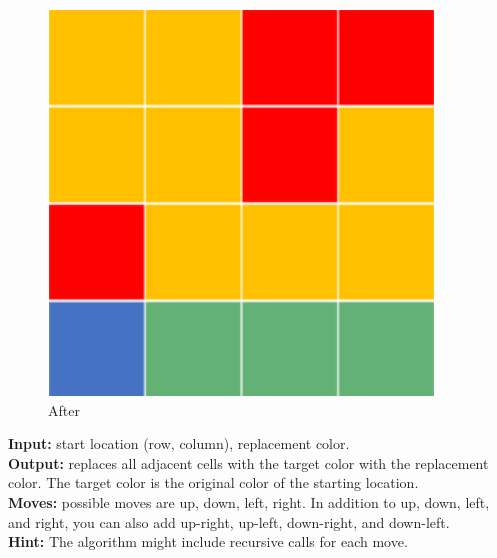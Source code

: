 \documentclass[addpoints]{exam}
\begin{document}
\begin{questions}
  \begin{figure}[h]
    \centering
    \includegraphics[scale=0.5]{image2.png}
    \caption{After}
  \end{figure}

  \textbf{Input:} start location (row, column), replacement color. \\
  \textbf{Output:} replaces all adjacent cells with the target color with the replacement color. The target color is the original color of the starting location. \\
  \textbf{Moves:} possible moves are up, down, left, right. In addition to up, down, left, and right, you can also add up-right, up-left, down-right, and down-left. \\
  \textbf{Hint:} The algorithm might include recursive calls for each move.



\end{questions}
\end{document}
